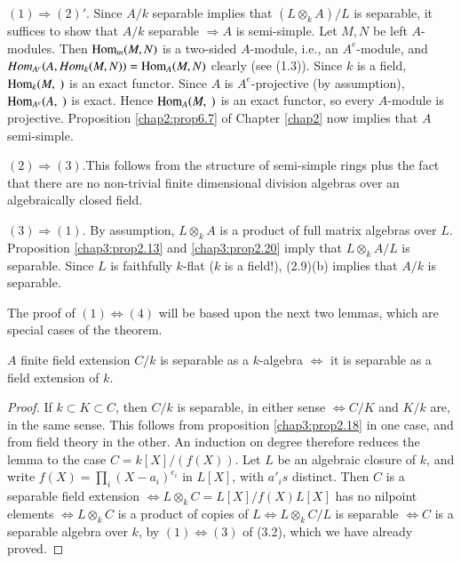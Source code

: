 \setcounter{proofofthm}{1}
    \begin{proofofthm}%
$(1) \Rightarrow (2)'$. Since $A/k$ separable implies that $(L
      \otimes_k A) /L$ is separable, it suffices to show that $A/k$
      separable $\Rightarrow A$ is semi-simple. Let $M, N$ be left
      $A$-modules. Then $\operatorname{Hom}_m (M, N)$ is a two-sided $A$-module,
      i.e., an $A^e$-module, and $Hom_{A^e}(A, Hom_k (M,N))=
      \operatorname{Hom}_A(M,N)$ clearly (see (1.3)). Since $k$ is a field,
      $\operatorname{Hom}_k(M, ~)$ is an exact functor. Since $A$ is
      $A^e$-projective (by assumption), $\operatorname{Hom}_{A^e}(A, ~)$ is
      exact. Hence $\operatorname{Hom}_A(M, ~)$ is an exact functor, so every
      $A$-module is projective. Proposition \ref{chap2:prop6.7} of
      Chapter \ref{chap2} now implies that $A$ semi-simple.  
    
    $(2) \Rightarrow (3)$.\pageoriginale This follows from the structure of
      semi-simple rings plus the fact that there are no non-trivial
      finite dimensional division algebras over an algebraically
      closed field. 
    
    $(3) \Rightarrow (1)$. By assumption, $L \otimes_k A$ is a product
      of full matrix algebras over $L$. Proposition
      \ref{chap3:prop2.13} and \ref{chap3:prop2.20} 
      imply that $L \otimes_k A/L$ is separable.  Since $L$ is
      faithfully $k$-flat ($k$ is a field!), (2.9)(b) implies that
      $A/k$ is separable. 
    
    The proof of $(1)  \Leftrightarrow (4)$ will be based upon the
    next two lemmas, which are special cases of the theorem. 
    \end{proofofthm}

\setcounter{lemma}{2}
    \begin{lemma}\label{chap3:lem3.3} %
$A$ finite field extension $C/k$ is separable as a $k$-algebra
      $\Leftrightarrow$ it is separable as a field extension of $k$. 
    \end{lemma}   

    \begin{proof}%
If $k \subset K \subset C$, then $C/k$ is separable, in either sense
$\Leftrightarrow C/K$ and $K/k$ are, in the same sense. This follows
from proposition \ref{chap3:prop2.18} in one case, and from field
theory in the 
other. An induction on degree therefore reduces the lemma to the case
$C=  k [X]/ (f(X))$. Let $L$ be an algebraic closure of $k$, and write
$f(X) = \prod\limits_{i}(X- a_i)^{e_i}$ in $L[X]$, with $a'_i s$
distinct. Then $C$ is a separable field extension $\Leftrightarrow L
\otimes_k C =L [X] / f (X) L[X]$ has no nilpoint elements
$\Leftrightarrow L \otimes_k C$ is a product of copies of $L
\Leftrightarrow L \otimes_k C/L$ is separable $\Leftrightarrow C$ is a
separable algebra over $k$, by $(1) \Leftrightarrow (3)$ of (3.2),
which we have already proved. 
    \end{proof}    
    
